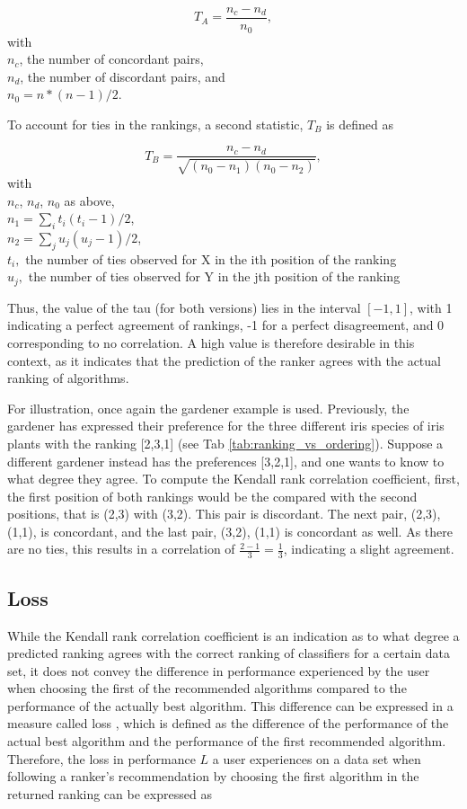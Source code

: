 $$T_A = \frac{n_c - n_d}{n_0},$$
with \\
$n_c$, the number of concordant pairs, \\
$n_d$, the number of discordant pairs, and \\
$n_0 = n * (n - 1) / 2$.

To account for ties in the rankings, a second statistic, $T_B$ is defined as

$$T_B = \frac{n_c - n_d}{\sqrt{(n_0 - n_1 )(n_0 - n_2 )}},$$
with \\
$n_c$, $n_d$, $n_0$ as above, \\
$n_1=\sum_i{t_i(t_i-1)/2}$, \\
$n_2=\sum_j{u_j(u_j-1)/2}$, \\
$t_i,$ the number of ties observed for X in the ith position of the ranking \\
$u_j,$ the number of ties observed for Y in the jth position of the ranking 

Thus, the value of the tau (for both versions) lies in the interval $[-1,1]$, with 1 indicating a perfect agreement of rankings, -1 for a perfect disagreement, and 0 corresponding to no correlation. A high value is therefore desirable in this context, as it indicates that the prediction of the ranker agrees with the actual ranking of algorithms.

For illustration, once again the gardener example is used. Previously, the gardener has expressed their preference for the three different iris species of iris plants with the ranking [2,3,1] (see Tab \ref{tab:ranking_vs_ordering}). Suppose a different gardener instead has the preferences [3,2,1], and one wants to know to what degree they agree. To compute the Kendall rank correlation coefficient, first, the first position of both rankings would be the compared with the second positions, that is (2,3) with (3,2). This pair is discordant. The next pair, (2,3), (1,1), is concordant, and the last pair, (3,2), (1,1) is concordant as well. As there are no ties, this results in a correlation of $\frac{2-1}{3}=\frac{1}{3}$, indicating a slight agreement. 

\subsection{Loss}
While the Kendall rank correlation coefficient is an indication as to what degree a predicted ranking agrees with the correct ranking of classifiers for a certain data set, it does not convey the difference in performance experienced by the user when choosing the first of the recommended algorithms compared to the performance of the actually best algorithm. This difference can be expressed in a measure called loss \cite{DBLP:conf/mldm/LeiteBV12}, which is defined as the difference of the performance of the actual best algorithm and the performance of the first recommended algorithm. Therefore, the loss in performance $L$ a user experiences on a data set when following a ranker's recommendation by choosing the first algorithm in the returned ranking can be expressed as 

